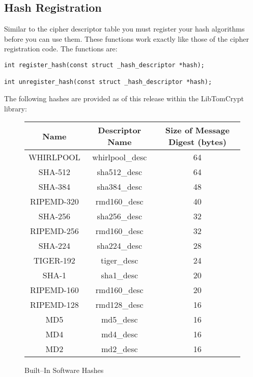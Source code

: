 \documentclass[synpaper]{book}
\begin{document}
\subsection{Hash Registration}
Similar to the cipher descriptor table you must register your hash algorithms before you can use them.  These functions
work exactly like those of the cipher registration code.  The functions are:
 
\begin{verbatim}
int register_hash(const struct _hash_descriptor *hash);

int unregister_hash(const struct _hash_descriptor *hash);
\end{verbatim}

The following hashes are provided as of this release within the LibTomCrypt library:

\begin{figure}[here]
\begin{center}
\begin{tabular}{|c|c|c|}
      \hline \textbf{Name} & \textbf{Descriptor Name} & \textbf{Size of Message Digest (bytes)} \\
      \hline WHIRLPOOL & whirlpool\_desc & 64 \\
      \hline SHA-512 & sha512\_desc & 64 \\
      \hline SHA-384 & sha384\_desc & 48 \\
      \hline RIPEMD-320 & rmd160\_desc & 40 \\
      \hline SHA-256 & sha256\_desc & 32 \\
      \hline RIPEMD-256 & rmd160\_desc & 32 \\
      \hline SHA-224 & sha224\_desc & 28 \\
      \hline TIGER-192 & tiger\_desc & 24 \\
      \hline SHA-1 & sha1\_desc & 20 \\
      \hline RIPEMD-160 & rmd160\_desc & 20 \\
      \hline RIPEMD-128 & rmd128\_desc & 16 \\
      \hline MD5 & md5\_desc & 16 \\
      \hline MD4 & md4\_desc & 16 \\
      \hline MD2 & md2\_desc & 16 \\
      \hline
\end{tabular}
\end{center}
\caption{Built--In Software Hashes}
\end{figure}
\vfil
\end{document}
